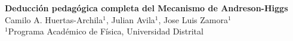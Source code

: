 \documentclass[12pt,a4paper]{article}
\begin{document}
\begin{center}
    \textbf{\Large Deducción pedagógica completa del Mecanismo de Andreson-Higgs}\\[1em]
    \normalsize
	Camilo A. Huertas-Archila$^{1}$, Julian Avila$^{1}$, Jose Luis Zamora$^{1}$\\[0.5em]
    $^{1}$Programa Académico de Física, Universidad Distrital\\[1em]
\end{center}

\vspace{1em}







\nocite{*}


\end{document}
